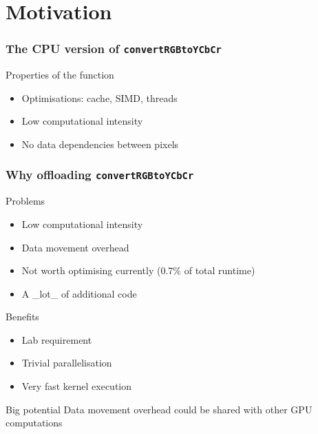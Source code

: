 \section{Motivation}
\begin{frame}[fragile]
  \frametitle{The CPU version of \lstinline{convertRGBtoYCbCr}}
   \pause{}
  \begin{alertblock}{Properties of the function}
    \begin{itemize}
    \item Optimisations: cache, SIMD, threads
    \item Low computational intensity
    \item No data dependencies between pixels
    \end{itemize}
  \end{alertblock}
\end{frame}

\begin{frame}
  \frametitle{Why offloading \lstinline{convertRGBtoYCbCr}}
  \pause{}
  \begin{block}{Problems}
    \begin{itemize}
    \item Low computational intensity
    \item Data movement overhead
    \item Not worth optimising currently (\(0.7\%\) of total runtime)
    \item A \_lot\_ of additional code
    \end{itemize}
  \end{block}
  \pause{}
  \begin{block}{Benefits}
    \begin{itemize}
    \item Lab requirement
    \item Trivial parallelisation
    \item Very fast kernel execution
    \end{itemize}
  \end{block}
  \pause{}
  \begin{alertblock}{Big potential}
    Data movement overhead could be shared with other GPU computations
  \end{alertblock}
\end{frame}

